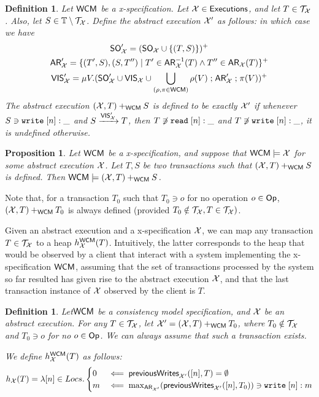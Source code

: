 \documentclass[a4paper,UKenglish]{article}%
\newif\ifdraft
\newcommand{\ac}[1]{\ifdraft{}{\color{blue}#1}\else{}\fi}
\newtheorem{definition}[theorem]{Definition}
\theoremstyle{plain}
\newtheorem{proposition}[theorem]{Proposition}
\begin{document}
\begin{definition}
Let $\mathsf{WCM}$ be a x-specification. 
Let $\mathcal{X} \in {\mathsf{Executions}}$, and let $T \in \mathcal{T}_{\mathcal{X}}$. 
Also, let $S \in \mathbb{T} \setminus \mathcal{T}_{\mathcal{X}}$.
Define the abstract execution $\mathcal{X}'$ as follows: 
in which case we have
\begin{gather*}
{\sf{SO}}_{\mathcal{X}}' = ({\sf{SO}}_{\mathcal{X}} \cup \{(T,S)\})^{+}\\
{\sf{AR}}_{\mathcal{X}}' = \{(T', S), (S, T'') \mid T' \in {\sf{AR}}_{\mathcal{X}}^{-1}(T) \wedge T'' \in {\sf{AR}}_{\mathcal{X}}(T)\}^{+}\\
{\mathsf{VIS}}_{\mathcal{X}}' = \mu V.({\sf{SO}}_{\mathcal{X}}' \cup {\mathsf{VIS}}_{\mathcal{X}} \cup \bigcup_{(\rho, \pi \in \mathsf{WCM})} \rho(V) \mathrel{;} {\sf{AR}}_{\mathcal{X}}' \mathrel{;} \pi(V) )^{+}
\end{gather*}
The abstract execution $(\mathcal{X}, T) +_{\mathsf{WCM}} S$ is defined to be exactly $\mathcal{X}'$ 
if whenever $S \ni {{\tt write}}\;[n]:\_$ and $S \xrightarrow{{\mathsf{VIS}}_{\mathcal{X}}'} T$, then $T \not\ni {{\tt read}}\;[n]:\_$ 
and $T \not\ni {{\tt write}}\;[n]:\_$, 
it is undefined otherwise.
\end{definition}

\begin{proposition}
Let $\mathsf{WCM}$ be a x-specification, and suppose that $\mathsf{WCM} \models \mathcal{X}$ for some abstract
execution $\mathcal{X}$. Let $T, S$ be two transactions such that $(\mathcal{X}, T) +_{\mathsf{WCM}} S$ is
defined. Then $\mathsf{WCM} \models (\mathcal{X}, T) +_{\mathsf{WCM}} S$.
\end{proposition}
\ac{Not sure whether it's true. Needs to be checked.}

Note that, for a transaction $T_0$ such that $T_0 \ni o$ for no operation $o \in \mathsf{Op}$, 
$(\mathcal{X}, T) +_{\mathsf{WCM}} T_0$ is always defined (provided $T_0 \notin \mathcal{T}_{\mathcal{X}}, T \in \mathcal{T}_{\mathcal{X}})$.

Given an abstract execution and a x-specification $\mathcal{X}$, we can map any transaction $T \in \mathcal{T}_{\mathcal{X}}$ 
to a heap $h_{\mathcal{X}}^{\mathsf{WCM}}(T)$. Intuitively, the latter corresponds to the heap that would be observed 
by a client that interact with a system implementing the x-specification $\mathsf{WCM}$, assuming that 
the set of transactions processed by the system so far resulted has given rise to the abstract execution 
$\mathcal{X}$, and that the last transaction instance of $\mathcal{X}$ observed by the client is $T$.

\begin{definition}
Let$\mathsf{WCM}$ be a consistency model specification, and $\mathcal{X}$ be an abstract execution. For any $T \in \mathcal{T}_{\mathcal{X}}$, 
let $\mathcal{X}' = (\mathcal{X}, T) +_{\mathsf{WCM}} T_0$, where $T_0 \notin \mathcal{T}_{\mathcal{X}}$ and $T_0 \ni o$ for no 
$o \in \mathsf{Op}$. We can always assume that such a transaction exists. 

We define $h_{\mathcal{X}}^{\mathsf{WCM}}(T)$ as follows:
\[
h_{\mathcal{X}}(T) = \lambda [n] \in Locs.
\begin{cases}
0 &\impliedby \mathsf{previousWrites}_{\mathcal{X}'}([n], T) = \emptyset\\
m & \impliedby \max_{{\sf{AR}}_{\mathcal{X}'}}(\mathsf{previousWrites}_{\mathcal{X}'}([n], T_0)) \ni {{\tt write}}\;[n]: m 
\end{cases}
\]
\end{definition}
\ac{I don't really like this definition, but for the moment it will do...}
\end{document}
